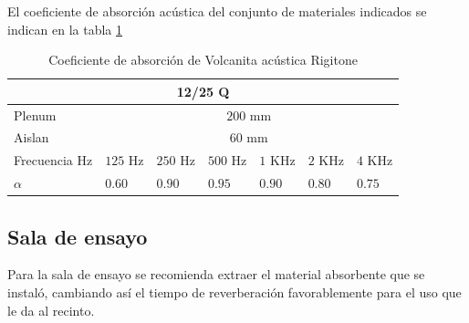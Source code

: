 El coeficiente de absorción acústica del conjunto de materiales indicados se indican en la tabla \ref{tab: coef abs volcanita Rigitone}
\begin{table}[H]
    \centering
    \begin{tabular}{|lllllll|}
    \hline
    \multicolumn{7}{|c|}{\textbf{12/25 Q}} \\ \hline
    \multicolumn{1}{|l|}{Plenum} & \multicolumn{6}{c|}{$200$ mm} \\ \hline
    \multicolumn{1}{|l|}{Aislan} & \multicolumn{6}{c|}{$60$  mm} \\ \hline
    \multicolumn{1}{|l|}{Frecuencia Hz} & \multicolumn{1}{l|}{$125$ Hz} & \multicolumn{1}{l|}{$250$ Hz} & \multicolumn{1}{l|}{$500$ Hz} & \multicolumn{1}{l|}{$1$ KHz} & \multicolumn{1}{l|}{$2$ KHz} & $4$ KHz \\ \hline
    \multicolumn{1}{|l|}{$\alpha$} & \multicolumn{1}{l|}{$0.60$} & \multicolumn{1}{l|}{$0.90$} & \multicolumn{1}{l|}{$0.95$} & \multicolumn{1}{l|}{$0.90$} & \multicolumn{1}{l|}{$0.80$} & $0.75$ \\ \hline
    \end{tabular}
    \caption{Coeficiente de absorción de Volcanita acústica Rigitone}
    \label{tab: coef abs volcanita Rigitone}
\end{table}  

\subsection{Sala de ensayo}
Para la sala de ensayo se recomienda extraer el material absorbente que se instaló, cambiando así el tiempo de reverberación favorablemente para el uso que le da al recinto.
